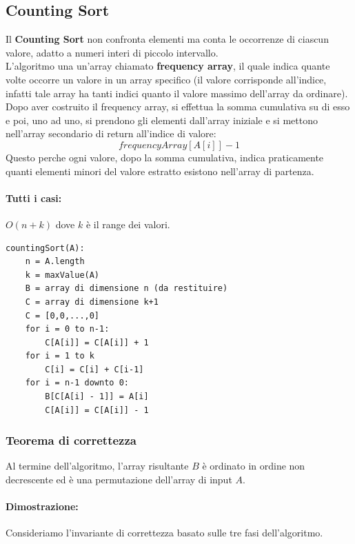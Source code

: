 \documentclass[a4paper,12pt]{article}
\begin{document}
\subsection{Counting Sort}
Il \textbf{Counting Sort} non confronta elementi ma conta le occorrenze di ciascun valore, adatto a numeri interi di piccolo intervallo.\\
L'algoritmo una un'array chiamato \textbf{frequency array}, il quale indica quante volte occorre un valore in un array specifico (il valore corrisponde all'indice, infatti tale array ha tanti indici quanto il valore massimo dell'array da ordinare).\\
Dopo aver costruito il frequency array, si effettua la somma cumulativa su di esso e poi, uno ad uno, si prendono gli elementi dall'array iniziale e si mettono nell'array secondario di return all'indice di valore:
\[
frequencyArray[A[i]] - 1
\]
Questo perche ogni valore, dopo la somma cumulativa, indica praticamente quanti elementi minori del valore estratto esistono nell'array di partenza.
\paragraph{Tutti i casi:} $O(n + k)$ dove $k$ è il range dei valori.

\begin{lstlisting}
countingSort(A):
    n = A.length
    k = maxValue(A)
    B = array di dimensione n (da restituire)
    C = array di dimensione k+1
    C = [0,0,...,0]
    for i = 0 to n-1:
        C[A[i]] = C[A[i]] + 1
    for i = 1 to k
        C[i] = C[i] + C[i-1]
    for i = n-1 downto 0:
        B[C[A[i] - 1]] = A[i]
        C[A[i]] = C[A[i]] - 1
\end{lstlisting}
\subsubsection{Teorema di correttezza}
Al termine dell'algoritmo, l'array risultante $B$ è ordinato in ordine non decrescente ed è una permutazione dell'array di input $A$.

\paragraph{Dimostrazione:}
Consideriamo l'invariante di correttezza basato sulle tre fasi dell'algoritmo.
\end{document}
